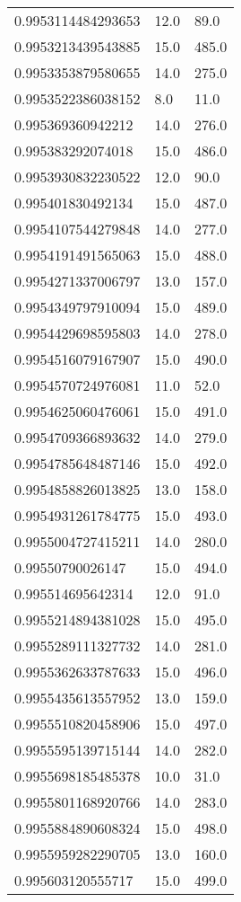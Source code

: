 \begin{center}
\begin{supertabular}[H]{p{0.30\textwidth}p{0.05\textwidth}p{0.05\textwidth}}
0.9953114484293653 & 12.0 & 89.0 \\ 
0.9953213439543885 & 15.0 & 485.0 \\ 
0.9953353879580655 & 14.0 & 275.0 \\ 
0.9953522386038152 & 8.0 & 11.0 \\ 
0.995369360942212 & 14.0 & 276.0 \\ 
0.995383292074018 & 15.0 & 486.0 \\ 
0.9953930832230522 & 12.0 & 90.0 \\ 
0.995401830492134 & 15.0 & 487.0 \\ 
0.9954107544279848 & 14.0 & 277.0 \\ 
0.9954191491565063 & 15.0 & 488.0 \\ 
0.9954271337006797 & 13.0 & 157.0 \\ 
0.9954349797910094 & 15.0 & 489.0 \\ 
0.9954429698595803 & 14.0 & 278.0 \\ 
0.9954516079167907 & 15.0 & 490.0 \\ 
0.9954570724976081 & 11.0 & 52.0 \\ 
0.9954625060476061 & 15.0 & 491.0 \\ 
0.9954709366893632 & 14.0 & 279.0 \\ 
0.9954785648487146 & 15.0 & 492.0 \\ 
0.9954858826013825 & 13.0 & 158.0 \\ 
0.9954931261784775 & 15.0 & 493.0 \\ 
0.9955004727415211 & 14.0 & 280.0 \\ 
0.99550790026147 & 15.0 & 494.0 \\ 
0.995514695642314 & 12.0 & 91.0 \\ 
0.9955214894381028 & 15.0 & 495.0 \\ 
0.9955289111327732 & 14.0 & 281.0 \\ 
0.9955362633787633 & 15.0 & 496.0 \\ 
0.9955435613557952 & 13.0 & 159.0 \\ 
0.9955510820458906 & 15.0 & 497.0 \\ 
0.9955595139715144 & 14.0 & 282.0 \\ 
0.9955698185485378 & 10.0 & 31.0 \\ 
0.9955801168920766 & 14.0 & 283.0 \\ 
0.9955884890608324 & 15.0 & 498.0 \\ 
0.9955959282290705 & 13.0 & 160.0 \\ 
0.995603120555717 & 15.0 & 499.0 \\ 

\end{supertabular}
\end{center}
